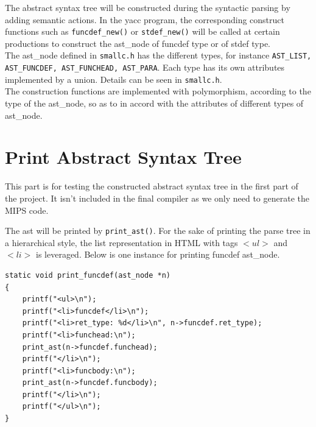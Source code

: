 \documentclass[a4paper]{article}
\begin{document}
The abstract syntax tree will be constructed during the syntactic parsing by adding semantic actions. In the yacc program, the corresponding construct functions such as \texttt{funcdef\_new()} or \texttt{stdef\_new()} will be called at certain productions to construct the ast\_node of funcdef type or of stdef type.\\


The ast\_node defined in \texttt{smallc.h} has the different types, for instance \texttt{AST\_LIST, AST\_FUNCDEF, AST\_FUNCHEAD, AST\_PARA}. Each type has its own attributes implemented by a union. Details can be seen in \texttt{smallc.h}.\\


The construction functions are implemented with polymorphism, according to the type of the ast\_node, so as to in accord with the attributes of different types of ast\_node.

\section{Print Abstract Syntax Tree}


This part is for testing the constructed abstract syntax tree in the first part of the project. It isn't included in the final compiler as we only need to generate the MIPS code.

The ast will be printed by \texttt{print\_ast()}. For the sake of printing the parse tree in a hierarchical style, the list representation in HTML with tags $<ul>$ and $<li>$ is leveraged. Below is one instance for printing funcdef ast\_node.

\begin{verbatim}
static void print_funcdef(ast_node *n)
{
    printf("<ul>\n");
    printf("<li>funcdef</li>\n");
    printf("<li>ret_type: %d</li>\n", n->funcdef.ret_type);
    printf("<li>funchead:\n");
    print_ast(n->funcdef.funchead);
    printf("</li>\n");
    printf("<li>funcbody:\n");
    print_ast(n->funcdef.funcbody);
    printf("</li>\n");
    printf("</ul>\n");
}
\end{verbatim}
\end{document}
